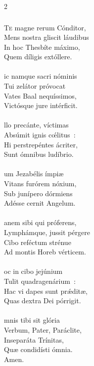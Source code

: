 \documentclass[9pt,twoside]{extarticle}
\begin{document}
\begin{multicols}{2}
{\subsubsection*{\center {}}
\lettrine{T}e magne rerum Cónditor,\\
Mens nostra gliscit láudibus\\
In hoc Thesbíte máximo,\\
Quem díligis extóllere.\\
\\
ic namque sacri nóminis\\
Tui zelátor próvocat\\
Vates Baal nequíssimos,\\
Victósque jure intérficit.\\
\\
llo precánte, víctimas\\
Absúmit ignis cœ́litus~:\\
Hi perstrepéntes ácriter,\\
Sunt ómnibus ludíbrio.\\
\\
um Jezabélis ímpiæ\\
Vitans furórem nóxium,\\
Sub junípero dórmiens \\
Adésse cernit Angelum.\\
\\
anem sibi qui próferens,\\
Lymphámque, jussit pérgere\\
Cibo reféctum strénue\\
Ad montis Horeb vérticem.\\
\\
oc in cibo jejúnium\\
Tulit quadragenárium~:\\
Hac vi dapes sunt prǽditæ,\\
Quas dextra Dei pórrigit.\\
\\
mnis tibi sit glória\\
Verbum, Pater, Paráclite,\\
Inseparáta Trínitas,\\
Quæ condidísti ómnia.\\
Amen.

}
\end{multicols}
\end{document}
